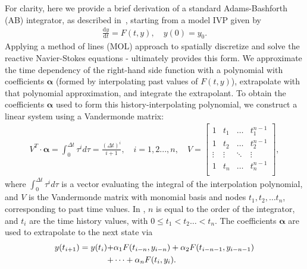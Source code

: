 For clarity, here we provide a brief derivation of a standard Adams-Bashforth (AB)
integrator, as described in~\cite{bashforth1883attempt}, starting from a model IVP
given by
\begin{align}
\frac{\text{d}y}{\text{d}t} = F(t,y), \quad y(0) = y_{0}. \label{eq:ivp}
\end{align}
Applying a method of lines (MOL) approach to spatially discretize and solve
the reactive Navier-Stokes equations  -  ultimately
provides this form. We approximate the time dependency of the right-hand side function
with a polynomial with coefficients $\boldsymbol{\alpha}$ (formed by interpolating past
values of $F(t,y)$), extrapolate with that polynomial approximation, and integrate
the extrapolant. To obtain the coefficients $\boldsymbol{\alpha}$ used to form this
history-interpolating polynomial, we construct a linear system using a Vandermonde matrix:
\begin{align}
V^{T} \cdot \boldsymbol{\alpha} = \int_0^{\Delta t} \tau^{i} d\tau = \frac{(\Delta t)^{i}}{i+1}, \quad i = 1,2...,n, \quad V = \begin{bmatrix}
    1 & t_{1} &  \hdots   & t_{1}^{n-1}  \\
    1 & t_{2} & \hdots &  t_{2}^{n-1} \\
      \vdots  & \vdots  &  \ddots   &  \vdots   \\
       1 &   t_{n}  &  \hdots  & t_{n}^{n-1} \\
        \end{bmatrix}, \label{eq:vandermonde}
\end{align}
where $\int_0^{\Delta t} \tau^{i} d\tau$ is a vector evaluating the integral of
the interpolation polynomial, and $V$ is the Vandermonde matrix with monomial
basis and nodes $t_{1}, t_{2}, \hdots t_{n}$, corresponding to past time
values. In , $n$ is equal to the order of the integrator,
and $t_{i}$ are the time history values, with $0 \leq t_{1} < t_{2} \hdots <
t_{n}$.  The coefficients $\boldsymbol{\alpha}$ are used to extrapolate to the
next state via
\begin{align}
y(t_{i+1}) = y(t_{i}) +& \alpha_{1}F(t_{i-n},y_{i-n}) + \alpha_{2}F(t_{i-n-1},y_{i-n-1}) \notag \\
+& \cdots + \alpha_{n}F(t_{i},y_{i}). \label{eq:ab_general}
\end{align}

